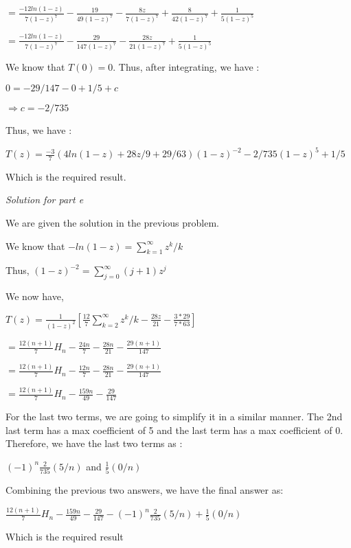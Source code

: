 \documentclass[11pt]{article}
\begin{document}
$ = \frac{-12ln(1-z)}{7(1-z)^7} - \frac{19}{49(1-z)^7} - \frac{8z}{7(1-z)^7} + \frac{8}{42(1-z)^7} + \frac{1}{5(1-z)^5}$

$ = \frac{-12ln(1-z)}{7(1-z)^7} - \frac{29}{147(1-z)^7} - \frac{28z}{21(1-z)^7} + \frac{1}{5(1-z)^5}$

We know that $T(0)=0$. Thus, after integrating, we have :

$0 = -29/147 -0 +1/5 +c$

$\Longrightarrow c = -2/735$

Thus, we have :

$T(z) = \frac{-3}{7}(4ln(1-z)+28z/9+29/63)(1-z)^{-2} - 2/735(1-z)^5 +1/5$

Which is the required result.


\medskip
\medskip

\textit{Solution for part e}

We are given the solution in the previous problem.

We know that $-ln(1-z) = \sum_{k=1}^{\infty} z^k/k$

Thus, $(1-z)^{-2} = \sum_{j=0}^{\infty} (j+1)z^j$

We now have,

$T(z) = \frac{1}{(1-z)^2} [\frac{12}{7} \sum_{k=2}^{\infty} z^k/k - \frac{28z}{21} -\frac{3*29}{7*63}]$

$ = \frac{12(n+1)}{7}H_n - \frac{24n}{7} - \frac{28n}{21} -\frac{29(n+1)}{147}$

$ = \frac{12(n+1)}{7}H_n - \frac{12n}{7} - \frac{28n}{21} -\frac{29(n+1)}{147}$

$ = \frac{12(n+1)}{7}H_n - \frac{159n}{49} -\frac{29}{147}$

For the last two terms, we are going to simplify it in a similar manner. The 2nd last term has a max coefficient of 5 and the last term has a max coefficient of 0.
Therefore, we have the last two terms as : 

$(-1)^n\frac{2}{735}(5/n)$ and $\frac{1}{5}(0/n)$

Combining the previous two answers, we have the final answer as:

$\frac{12(n+1)}{7}H_n - \frac{159n}{49} -\frac{29}{147} -(-1)^n\frac{2}{735}(5/n)+\frac{1}{5}(0/n)$ 

Which is the required result
\end{document}
